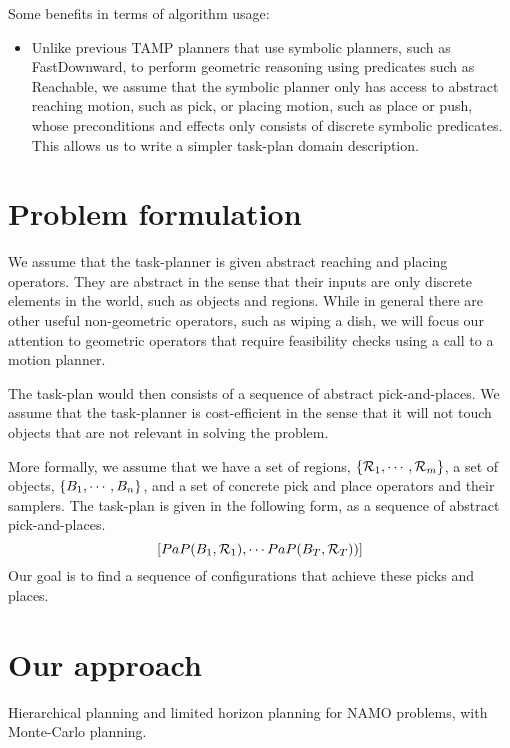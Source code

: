 \documentclass[10pt,letterpaper]{article}
\begin{document}
\iffalse
Some benefits in terms of algorithm usage:
\begin{itemize}
\item Unlike previous TAMP planners that use symbolic planners, such as 
FastDownward, to perform geometric reasoning using predicates such as
Reachable, we assume that the symbolic planner only has access to abstract
reaching motion, such as pick, or placing motion, such as place or push,
whose preconditions and effects only consists of discrete symbolic 
predicates. This allows us to write a simpler task-plan domain description.
\end{itemize}

\section{Problem formulation}
We assume that the task-planner is given abstract reaching and placing
operators. They are abstract in the sense that their inputs are only discrete 
elements in the world, such as objects and regions. While in general
there are other useful non-geometric operators, such as wiping a dish,
we will focus our attention to geometric operators that require 
feasibility checks using a call to a motion planner.

The task-plan would then consists of a sequence of abstract pick-and-places.
We assume that the task-planner is cost-efficient in the sense that it will
not touch objects that are not relevant in solving the problem. 

More formally, we assume that we have a set of regions, $\{\mathcal{R}_1,\cdots,\mathcal{R}_m\}$,
a set of objects, $\{B_1,\cdots,B_n\}$, and a set of concrete pick and place
operators and their samplers. 
The task-plan is given in the following form, as a sequence
of abstract pick-and-places.
$$[PaP(B_1, \mathcal{R}_1), \cdots PaP(B_T, \mathcal{R}_T))]$$
Our goal is to find a sequence of configurations
that achieve these picks and places.

\section{Our approach}
Hierarchical planning and limited horizon planning for NAMO problems, with Monte-Carlo
planning.
\end{document}
